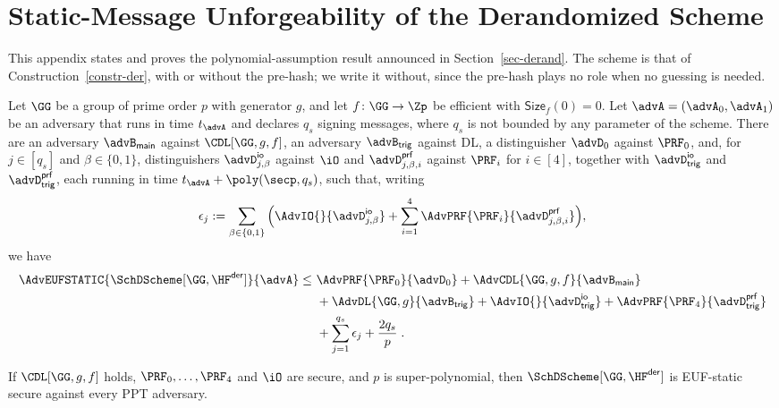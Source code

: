 \section{Static-Message Unforgeability of the Derandomized Scheme} \label{app-der-static}

This appendix states and proves the polynomial-assumption result announced in Section~\ref{sec-derand}. The scheme is that of Construction~\ref{constr-der}, with or without the pre-hash; we write it without, since the pre-hash plays no role when no guessing is needed.


\begin{theorem} \label{thm-der-static}
Let $\GG$ be a group of prime order $p$ with generator $g$, and let $f\colon\GG\to\Zp$ be efficient with $\mathsf{Size}_f(0)=0$. Let $\advA=(\advA_0,\advA_1)$ be an adversary that runs in time $t_{\advA}$ and declares $q_s$ signing messages, where $q_s$ is not bounded by any parameter of the scheme. There are an adversary $\advB_{\mathsf{main}}$ against $\CDL[\GG,g,f]$, an adversary $\advB_{\mathsf{trig}}$ against DL, a distinguisher $\advD_0$ against $\PRF_0$, and, for $j\in[q_s]$ and $\beta\in\{0,1\}$, distinguishers $\advD^{\mathsf{io}}_{j,\beta}$ against $\iO$ and $\advD^{\mathsf{prf}}_{j,\beta,i}$ against $\PRF_i$ for $i\in[4]$, together with $\advD^{\mathsf{io}}_{\mathsf{trig}}$ and $\advD^{\mathsf{prf}}_{\mathsf{trig}}$, each running in time $t_{\advA}+\poly(\secp,q_s)$, such that, writing
$$
\epsilon_j
:=
\sum_{\beta\in\{0,1\}}
\Big(
\AdvIO{}{\advD^{\mathsf{io}}_{j,\beta}}
+\sum_{i=1}^{4}\AdvPRF{\PRF_i}{\advD^{\mathsf{prf}}_{j,\beta,i}}
\Big),
$$
we have
$$
\begin{aligned}
\AdvEUFSTATIC{\SchDScheme[\GG,\HF^{\mathsf{der}}]}{\advA}
\le\ &\AdvPRF{\PRF_0}{\advD_0}
+\AdvCDL{\GG,g,f}{\advB_{\mathsf{main}}} \\
&+\AdvDL{\GG,g}{\advB_{\mathsf{trig}}}
+\AdvIO{}{\advD^{\mathsf{io}}_{\mathsf{trig}}}
+\AdvPRF{\PRF_4}{\advD^{\mathsf{prf}}_{\mathsf{trig}}} \\
&+\sum_{j=1}^{q_s}\epsilon_j
+\frac{2q_s}{p} \;.
\end{aligned}
$$
\end{theorem}

\begin{corollary} \label{cor-der-static}
If $\CDL[\GG,g,f]$ holds, $\PRF_0,\ldots,\PRF_4$ and $\iO$ are secure, and $p$ is super-polynomial, then $\SchDScheme[\GG,\HF^{\mathsf{der}}]$ is EUF-static secure against every PPT adversary.
\end{corollary}

